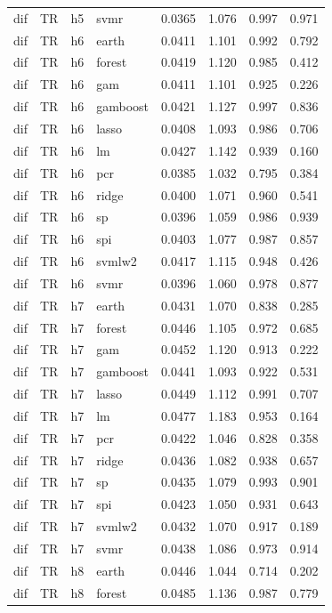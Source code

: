 \begin{ThreePartTable}
\begin{longtable}[t]{llclcccc}
dif & TR & h5 & svmr & 0.0365 & 1.076 & 0.997 & 0.971\\
\addlinespace
dif & TR & h6 & earth & 0.0411 & 1.101 & 0.992 & 0.792\\
dif & TR & h6 & forest & 0.0419 & 1.120 & 0.985 & 0.412\\
dif & TR & h6 & gam & 0.0411 & 1.101 & 0.925 & 0.226\\
dif & TR & h6 & gamboost & 0.0421 & 1.127 & 0.997 & 0.836\\
dif & TR & h6 & lasso & 0.0408 & 1.093 & 0.986 & 0.706\\
dif & TR & h6 & lm & 0.0427 & 1.142 & 0.939 & 0.160\\
dif & TR & h6 & pcr & 0.0385 & 1.032 & 0.795 & 0.384\\
dif & TR & h6 & ridge & 0.0400 & 1.071 & 0.960 & 0.541\\
dif & TR & h6 & sp & 0.0396 & 1.059 & 0.986 & 0.939\\
dif & TR & h6 & spi & 0.0403 & 1.077 & 0.987 & 0.857\\
dif & TR & h6 & svmlw2 & 0.0417 & 1.115 & 0.948 & 0.426\\
dif & TR & h6 & svmr & 0.0396 & 1.060 & 0.978 & 0.877\\
\addlinespace
dif & TR & h7 & earth & 0.0431 & 1.070 & 0.838 & 0.285\\
dif & TR & h7 & forest & 0.0446 & 1.105 & 0.972 & 0.685\\
dif & TR & h7 & gam & 0.0452 & 1.120 & 0.913 & 0.222\\
dif & TR & h7 & gamboost & 0.0441 & 1.093 & 0.922 & 0.531\\
dif & TR & h7 & lasso & 0.0449 & 1.112 & 0.991 & 0.707\\
dif & TR & h7 & lm & 0.0477 & 1.183 & 0.953 & 0.164\\
dif & TR & h7 & pcr & 0.0422 & 1.046 & 0.828 & 0.358\\
dif & TR & h7 & ridge & 0.0436 & 1.082 & 0.938 & 0.657\\
dif & TR & h7 & sp & 0.0435 & 1.079 & 0.993 & 0.901\\
dif & TR & h7 & spi & 0.0423 & 1.050 & 0.931 & 0.643\\
dif & TR & h7 & svmlw2 & 0.0432 & 1.070 & 0.917 & 0.189\\
dif & TR & h7 & svmr & 0.0438 & 1.086 & 0.973 & 0.914\\
\addlinespace
dif & TR & h8 & earth & 0.0446 & 1.044 & 0.714 & 0.202\\
dif & TR & h8 & forest & 0.0485 & 1.136 & 0.987 & 0.779\\

\end{longtable}
\end{ThreePartTable}
